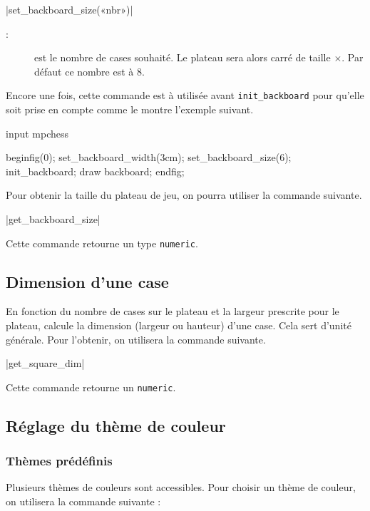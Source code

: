 \documentclass[french]{ltxdoc}
\begin{document}
\commande|set_backboard_size(«nbr»)|
\smallskip{}

\begin{description}
  \item[:] est le nombre de cases souhaité. Le plateau sera alors carré de taille $\times$. Par défaut ce nombre est à 8.
\end{description}

Encore une fois, cette commande est à utilisée avant \lstinline+init_backboard+ pour qu’elle soit prise en compte comme le montre l’exemple suivant.

\begin{ExempleMP}[label=ex:widthcase]
input mpchess

beginfig(0);
set_backboard_width(3cm);
set_backboard_size(6);
init_backboard;
draw backboard;
endfig;
\end{ExempleMP}

Pour obtenir la taille du plateau de jeu, on pourra utiliser la commande
suivante. 

\commande|get_backboard_size|\smallskip{}

Cette commande retourne un type \lstinline+numeric+.

\subsection{Dimension d’une case}

En fonction du nombre de cases sur le plateau et la largeur prescrite pour le
plateau, \mpchess calcule la dimension (largeur ou hauteur) d’une case. Cela
sert d’unité générale. Pour l’obtenir, on utilisera la commande suivante.

\commande|get_square_dim|\smallskip{}

Cette commande retourne un \lstinline+numeric+.

\subsection{Réglage du thème de couleur}

\subsubsection{Thèmes prédéfinis}

Plusieurs thèmes de couleurs sont accessibles. Pour choisir un thème de couleur, on utilisera la commande suivante :
\end{document}
